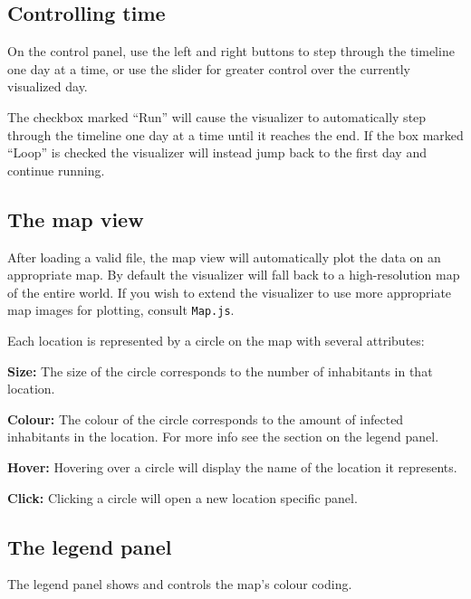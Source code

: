 \subsection{Controlling time}

On the control panel, use the left and right buttons to step through the timeline one day at a time, or use the slider for greater control over the currently visualized day.

The checkbox marked ``{Run}'' will cause the visualizer to automatically step through the timeline one day at a time until it reaches the end. If the box marked ``{Loop}'' is checked the visualizer will instead jump back to the first day and continue running.


\subsection{The map view}

After loading a valid file, the map view will automatically plot the data on an appropriate map. By default the visualizer will fall back to a high-resolution map of the entire world. If you wish to extend the visualizer to use more appropriate map images for plotting, consult \texttt{Map.js}.

Each location is represented by a circle on the map with several attributes:

\begin{compactitem}

\item \textbf{Size:} The size of the circle corresponds to the number of inhabitants in that location.
\item \textbf{Colour:} The colour of the circle corresponds to the amount of infected inhabitants in the location. For more info see the section on the legend panel.
\item \textbf{Hover:} Hovering over a circle will display the name of the location it represents.
\item \textbf{Click:} Clicking a circle will open a new location specific panel.

\end{compactitem}

\subsection{The legend panel}

The legend panel shows and controls the map's colour coding.

